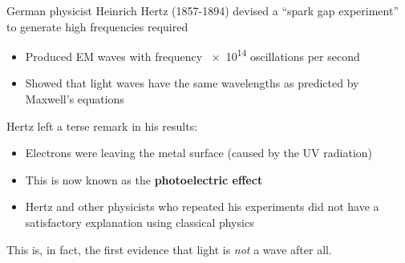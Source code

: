 %
%
%
%
German physicist Heinrich Hertz (1857-1894) devised a ``spark gap experiment''
to generate high frequencies required
\begin{figure}[ht]
  \centering
\end{figure}
\begin{itemize}
\item Produced EM waves with frequency \num{e14} oscillations per second
\item Showed that light waves have the same wavelengths as predicted by
  Maxwell's equations
\end{itemize}


Hertz left a terse remark in his results:
\begin{center}
  \end{center}
\begin{itemize}
\item Electrons were leaving the metal surface (caused by the UV radiation)
\item This is now known as the \textbf{photoelectric effect}
\item Hertz and other physicists who repeated his experiments did not have a
  satisfactory explanation using classical physics
\end{itemize}
This is, in fact, the first evidence that light is \emph{not} a wave after all.





